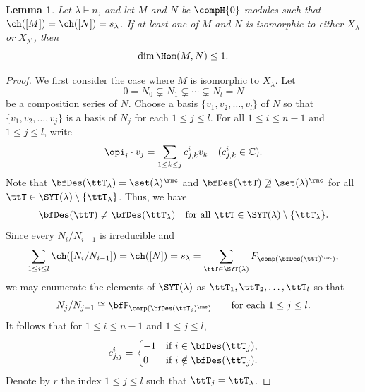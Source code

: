 \documentclass[12pt, reqno]{amsart}
\theoremstyle{plain}
\newtheorem{lemma}[lemma]{Lemma}
\theoremstyle{definition}
\numberwithin{equation}{section}
\numberwithin{figure}{section}
\numberwithin{table}{section}
\def\C{\mathbb C}
\begin{document}
\begin{lemma}\label{lem: basic lemma for Hom}
Let $\lambda \vdash n$, and let $M$ and $N$ be $\compH{0}$-modules such that $\ch([M]) = \ch([N])=s_\lambda$.
If at least one of $M$ and $N$ is isomorphic to either $X_\lambda$ or $X_{\lambda^\circ}$, then
\[
\dim \Hom(M,N)\leq 1.
\]
\end{lemma}
\begin{proof}
We first consider the case where $M$ is isomorphic to $X_{\lambda}$.
Let
\[
0 = N_0 \subsetneq N_1 \subsetneq \cdots \subsetneq N_l = N
\]
be a composition series of $N$.
Choose a basis $\{v_1,v_2,\ldots,v_l\}$ of $N$  so that $\{v_1,v_2,\ldots,v_j\}$ is a basis of $N_j$
for each $1 \leq j \leq l$.
For all $1 \leq i \leq n-1$ and $1 \leq j \leq l$, write 
\begin{align}\label{eq: action on the basis}
\opi_i \cdot v_j = \sum_{1 \leq k \leq j} c^{i}_{j, k} v_{k} \quad(c^{i}_{j, k} \in \C).
\end{align}
Note that $\bfDes(\ttT_{\lambda}) = \set(\lambda)^\rmc$ and $\bfDes(\ttT) \not\supseteq \set(\lambda)^\rmc$ for all $\ttT \in \SYT(\lambda) \setminus \{\ttT_{\lambda}\}$. Thus, we have \begin{align}\label{eq: descent property of normal SYT} \bfDes(\ttT) \not\supseteq \bfDes(\ttT_{\lambda}) \quad\text{for all $\ttT \in \SYT(\lambda) \setminus \{\ttT_{\lambda}\}$.} 
\end{align}
Since every $N_i/N_{i-1}$ is irreducible and 
\[
\sum_{1 \leq i \leq l} \ch([N_i/N_{i-1}]) = 
\ch([N])
=
s_{\lambda}
= 
\sum_{\ttT\in\SYT(\lambda)}
F_{\comp(\bfDes(\ttT)^\rmc)},
\]
we may enumerate the elements of $\SYT(\lambda)$ as
$\ttT_1,\ttT_2,\ldots,\ttT_l$ so that
\[
N_j/N_{j-1}
\cong
\bfF_{\comp(\bfDes(\ttT_j)^{\rmc})}
\qquad
\text{for each }1\leq j\leq l.
\]
It follows that for $1\leq i\leq n-1$ and  $1\leq j\leq l$,
\begin{align}\label{eq: nonzero leading condition}
c^i_{j,j}
=
\begin{cases}
-1 & \text{if } i\in\bfDes(\ttT_j),\\
0  & \text{if } i\notin\bfDes(\ttT_j).
\end{cases}
\end{align}
Denote by $r$ the index $1 \leq j \leq l$ such that
$\ttT_{j}=\ttT_\lambda$.





\end{proof}
\end{document}
